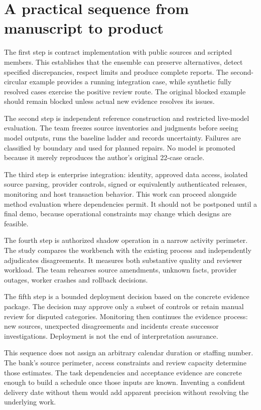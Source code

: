 \documentclass[12pt,a4paper,oneside,openany]{book}
\begin{document}
\section{A practical sequence from manuscript to product}
\label{merge:M10:14}


The first step is contract implementation with public sources and scripted
members. This establishes that the ensemble can preserve alternatives, detect
specified discrepancies, respect limits and produce complete reports. The
second-circular example provides a running integration case, while synthetic
fully resolved cases exercise the positive review route. The original blocked
example should remain blocked unless actual new evidence resolves its issues.

The second step is independent reference construction and restricted live-model
evaluation. The team freezes source inventories and judgments before seeing
model outputs, runs the baseline ladder and records uncertainty. Failures are
classified by boundary and used for planned repairs. No model is promoted because
it merely reproduces the author's original 22-case oracle.

The third step is enterprise integration: identity, approved data access, isolated
source parsing, provider controls, signed or equivalently authenticated releases,
monitoring and host transaction behavior. This work can proceed alongside method
evaluation where dependencies permit. It should not be postponed until a final
demo, because operational constraints may change which designs are feasible.

The fourth step is authorized shadow operation in a narrow activity perimeter.
The study compares the workbench with the existing process and independently
adjudicates disagreements. It measures both substantive quality and reviewer
workload. The team rehearses source amendments, unknown facts, provider outages,
worker crashes and rollback decisions.

The fifth step is a bounded deployment decision based on the concrete evidence
package. The decision may approve only a subset of controls or retain manual
review for disputed categories. Monitoring then continues the evidence process:
new sources, unexpected disagreements and incidents create successor
investigations. Deployment is not the end of interpretation assurance.

This sequence does not assign an arbitrary calendar duration or staffing number.
The bank's source perimeter, access constraints and review capacity determine
those estimates. The task dependencies and acceptance evidence are concrete enough
to build a schedule once those inputs are known. Inventing a confident delivery
date without them would add apparent precision without resolving the underlying
work.
\end{document}
